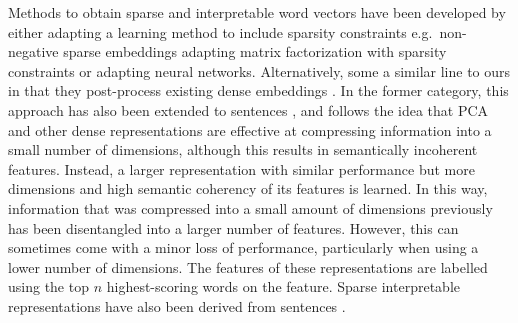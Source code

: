 Methods to obtain sparse and interpretable word vectors have been developed by either adapting a learning method to include sparsity constraints e.g.\  non-negative sparse embeddings adapting matrix factorization with  sparsity constraints \cite{Murphy} or \cite{Luo2015} adapting neural networks. Alternatively, some  a similar line to ours in that they post-process existing dense embeddings \cite{Subramanian, Park2017, Faruqui2015}. In the former category,  this approach has also been extended to sentences \cite{Trifonov2018}, and follows the idea that PCA and other dense representations are effective at compressing information into a small number of dimensions, although this  results in semantically incoherent features. Instead, a larger representation with similar performance but more dimensions and high semantic coherency of its features is learned. In this way, information that was compressed into a small amount of dimensions previously has been disentangled into a larger number of features.  However, this can sometimes come with a minor loss of performance, particularly when using a lower number of dimensions. The features of these representations are labelled using the top $n$ highest-scoring words on the feature. Sparse interpretable representations have also been derived from sentences \cite{Trifonov}.


